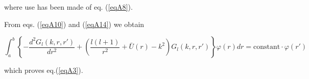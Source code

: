 where use has been made of eq. (\ref{eqA8}).


From eqs.  (\ref{eqA10}) and  (\ref{eqA14}) we obtain

\begin{equation*}
\int_a^b\left\lbrace -\frac{d^2G_l(k,r,r')}{dr^2}+\left( \frac{l(l+1)}{r^2}+\bar U(r)-k^2\right) G_l(k,r,r')\right\rbrace \varphi(r) dr = \text{constant}\cdot\varphi(r')
\end{equation*}

which proves eq.(\ref{eqA3}).
















